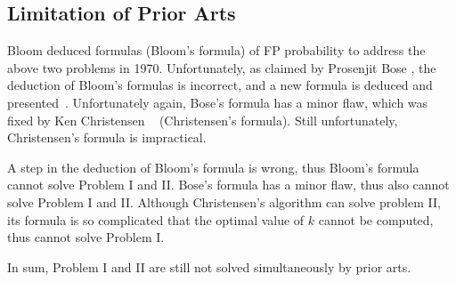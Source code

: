 
\subsection{Limitation of Prior Arts}
Bloom \etal deduced formulas (Bloom's formula) of FP probability to address the above two problems in 1970. Unfortunately, as claimed by Prosenjit Bose \etal, the deduction of Bloom's formulas is incorrect, and a new formula is deduced and presented~\cite{bose2008false}. 
Unfortunately again, Bose's formula has a minor flaw, which was fixed by Ken Christensen \etal~\cite{ken2010false} (Christensen's formula). Still unfortunately, Christensen's formula is impractical. %


A step in the deduction of Bloom's formula is wrong, thus Bloom's formula cannot solve Problem I and II.
Bose's formula has a minor flaw, thus also cannot solve Problem I and II. 
Although Christensen's algorithm can solve problem II, its formula is so complicated that the optimal value of $k$ cannot be computed, thus cannot solve Problem I. 

In sum, Problem I and II are still not solved simultaneously by prior arts. 


%
%



%
